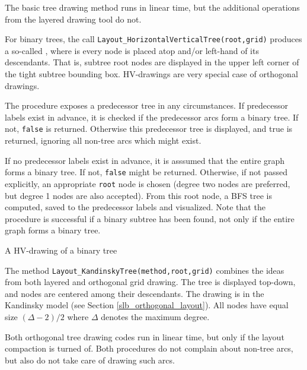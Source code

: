 \documentclass[a4paper,11pt,twoside]{book}
\begin{document}
\begin{multicols}{2}
The basic tree drawing method runs in linear time, but the additional operations
from the layered drawing tool do not.

For binary trees, the call \verb/Layout_HorizontalVerticalTree(root,grid)/ produces
a so-called , where is every node is placed atop and/or left-hand of
its descendants. That is, subtree root nodes are displayed in the upper left corner
of the tight subtree bounding box. HV-drawings are very special case of orthogonal
drawings.

The procedure exposes a predecessor tree in any circumstances. If predecessor
labels exist in advance, it is checked if the predecessor arcs form a binary
tree. If not, \verb/false/ is returned. Otherwise this predecessor tree is
displayed, and true is returned, ignoring all non-tree arcs which might exist.

If no predecessor labels exist in advance, it is asssumed that the entire graph
forms a binary tree. If not, \verb/false/ might be returned. Otherwise, if not
passed explicitly, an appropriate \verb/root/ node is chosen (degree two nodes
are preferred, but degree 1 nodes are also accepted). From this root node, a BFS
tree is computed, saved to the predecessor labels and visualized. Note that the
procedure is successful if a binary subtree has been found, not only if the
entire graph forms a binary tree.

\bigskip
\begin{figurehere}
\begin{center}
\epsfxsize=7cm
\vspace{0.5cm}
\caption{\label{flb_hv_tree}A HV-drawing of a binary tree}
\end{center}
\end{figurehere}

The method \verb/Layout_KandinskyTree(method,root,grid)/ combines the ideas from
both layered and orthogonal grid drawing. The tree is displayed top-down, and
nodes are centered among their descendants. The drawing is in the Kandinsky model
(see Section \ref{slb_orthogonal_layout}). All nodes have equal size
${(\Delta-2)/2}$ where $\Delta$ denotes the maximum degree.

Both orthogonal tree drawing codes run in linear time, but only if the layout
compaction is turned of. Both procedures do not complain about non-tree arcs,
but also do not take care of drawing such arcs.



\end{multicols}
\end{document}

